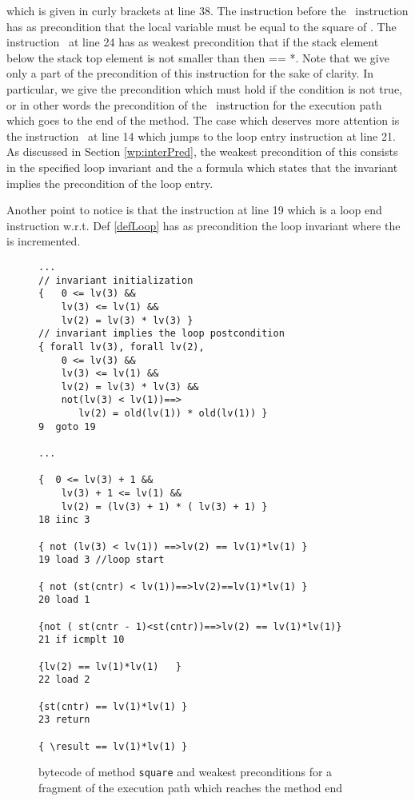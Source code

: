 which is given in curly brackets at line 38.
The instruction before the \return \ instruction has as precondition that the local variable  must be equal to the square of .
 The instruction \ifCond \ at line 24  has as weakest precondition that   if the stack element below the stack top element 
 is not smaller than    \stack{\counter } then   == *. Note that we give only a part of the precondition of this instruction for the sake
of clarity. In particular, we give the precondition which must hold if the condition is not true, or in other words the precondition of the \ifCond \ instruction for the execution path which goes to the end of the method. 
The  case which deserves more attention is the instruction \goto \ at line 14 which jumps to the loop entry instruction at line 21. 
As  discussed in Section \ref{wp:interPred}, the weakest precondition of this \goto consists in the specified loop invariant and the a formula
which states that the invariant implies the precondition of the loop entry.  

Another point to notice is that the instruction at line 19 which is a loop end instruction w.r.t. Def \ref{defLoop} has as precondition the loop invariant where the 
 is incremented.

\begin{figure}
\begin{lstlisting}[frame=trbl]
...
// invariant initialization
{   0 <= lv(3) && 
    lv(3) <= lv(1) && 
    lv(2) = lv(3) * lv(3) } 
// invariant implies the loop postcondition 
{ forall lv(3), forall lv(2),
    0 <= lv(3) && 
    lv(3) <= lv(1) && 
    lv(2) = lv(3) * lv(3) &&
    not(lv(3) < lv(1))==> 
       lv(2) = old(lv(1)) * old(lv(1)) }
9  goto 19

...

{  0 <= lv(3) + 1 && 
    lv(3) + 1 <= lv(1) && 
    lv(2) = (lv(3) + 1) * ( lv(3) + 1) } 
18 iinc 3

{ not (lv(3) < lv(1)) ==>lv(2) == lv(1)*lv(1) }
19 load 3 //loop start

{ not (st(cntr) < lv(1))==>lv(2)==lv(1)*lv(1) }
20 load 1

{not ( st(cntr - 1)<st(cntr))==>lv(2) == lv(1)*lv(1)}
21 if icmplt 10

{lv(2) == lv(1)*lv(1)   }
22 load 2

{st(cntr) == lv(1)*lv(1) }
23 return

{ \result == lv(1)*lv(1) }
\end{lstlisting} 
\caption{\sc  bytecode of method \lstinline!square! and weakest preconditions for  a fragment of the execution path which reaches the method end}
\label{wp:example:sqrBcVc}
\end{figure}


